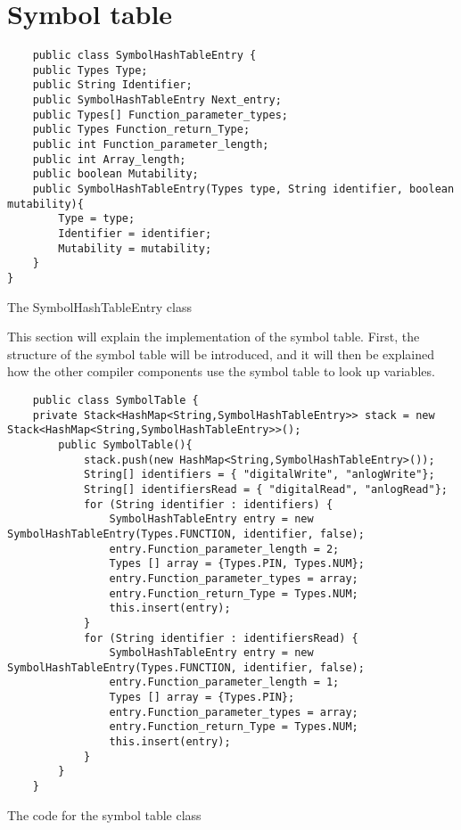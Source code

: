\section{Symbol table}


\begin{listing}[htb!]
    \begin{verbatim}
    public class SymbolHashTableEntry {
    public Types Type;
    public String Identifier;
    public SymbolHashTableEntry Next_entry;
    public Types[] Function_parameter_types;
    public Types Function_return_Type;
    public int Function_parameter_length;
    public int Array_length;
    public boolean Mutability;
    public SymbolHashTableEntry(Types type, String identifier, boolean mutability){
        Type = type;
        Identifier = identifier;
        Mutability = mutability;
    }
}
\end{verbatim}
    \caption{The SymbolHashTableEntry class}
    \label{lst:SymbolHashTableEntry}
\end{listing}


This section will explain the implementation of the symbol table. First, the structure of
the symbol table will be introduced, and it will then be explained how the other
compiler components use the symbol table to look up variables.


\begin{listing}[htb!]
    \begin{verbatim}
    public class SymbolTable {
    private Stack<HashMap<String,SymbolHashTableEntry>> stack = new Stack<HashMap<String,SymbolHashTableEntry>>();
        public SymbolTable(){
            stack.push(new HashMap<String,SymbolHashTableEntry>());
            String[] identifiers = { "digitalWrite", "anlogWrite"};
            String[] identifiersRead = { "digitalRead", "anlogRead"};
            for (String identifier : identifiers) {
                SymbolHashTableEntry entry = new SymbolHashTableEntry(Types.FUNCTION, identifier, false);
                entry.Function_parameter_length = 2;
                Types [] array = {Types.PIN, Types.NUM};
                entry.Function_parameter_types = array;
                entry.Function_return_Type = Types.NUM;
                this.insert(entry);
            }
            for (String identifier : identifiersRead) {
                SymbolHashTableEntry entry = new SymbolHashTableEntry(Types.FUNCTION, identifier, false);
                entry.Function_parameter_length = 1;
                Types [] array = {Types.PIN};
                entry.Function_parameter_types = array;
                entry.Function_return_Type = Types.NUM;
                this.insert(entry);   
            }
        }
    }
\end{verbatim}
    \caption{The code for the symbol table class}
    \label{lst:SymbolTable}
\end{listing}



